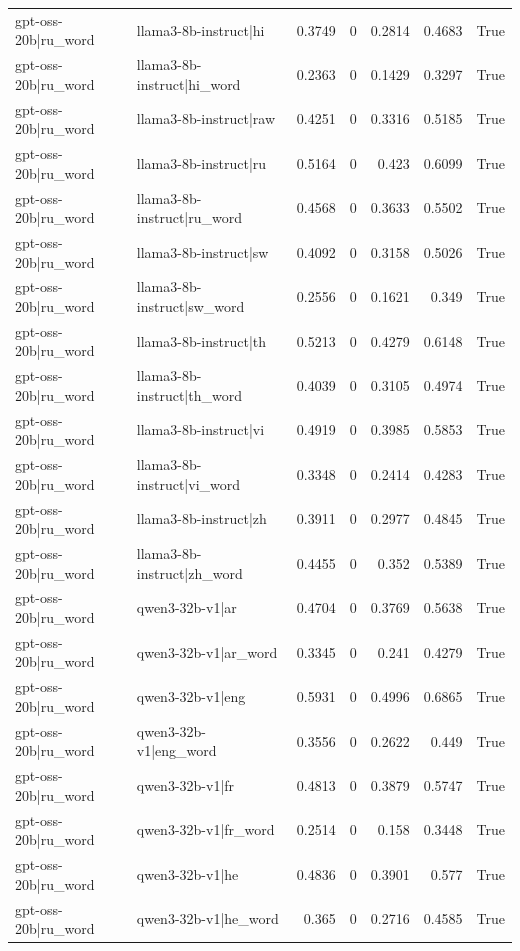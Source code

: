 \begin{table}
\begin{tabular}{l l r r r r l}
gpt-oss-20b|ru_word & llama3-8b-instruct|hi & 0.3749 & 0 & 0.2814 & 0.4683 & True \\
gpt-oss-20b|ru_word & llama3-8b-instruct|hi_word & 0.2363 & 0 & 0.1429 & 0.3297 & True \\
gpt-oss-20b|ru_word & llama3-8b-instruct|raw & 0.4251 & 0 & 0.3316 & 0.5185 & True \\
gpt-oss-20b|ru_word & llama3-8b-instruct|ru & 0.5164 & 0 & 0.423 & 0.6099 & True \\
gpt-oss-20b|ru_word & llama3-8b-instruct|ru_word & 0.4568 & 0 & 0.3633 & 0.5502 & True \\
gpt-oss-20b|ru_word & llama3-8b-instruct|sw & 0.4092 & 0 & 0.3158 & 0.5026 & True \\
gpt-oss-20b|ru_word & llama3-8b-instruct|sw_word & 0.2556 & 0 & 0.1621 & 0.349 & True \\
gpt-oss-20b|ru_word & llama3-8b-instruct|th & 0.5213 & 0 & 0.4279 & 0.6148 & True \\
gpt-oss-20b|ru_word & llama3-8b-instruct|th_word & 0.4039 & 0 & 0.3105 & 0.4974 & True \\
gpt-oss-20b|ru_word & llama3-8b-instruct|vi & 0.4919 & 0 & 0.3985 & 0.5853 & True \\
gpt-oss-20b|ru_word & llama3-8b-instruct|vi_word & 0.3348 & 0 & 0.2414 & 0.4283 & True \\
gpt-oss-20b|ru_word & llama3-8b-instruct|zh & 0.3911 & 0 & 0.2977 & 0.4845 & True \\
gpt-oss-20b|ru_word & llama3-8b-instruct|zh_word & 0.4455 & 0 & 0.352 & 0.5389 & True \\
gpt-oss-20b|ru_word & qwen3-32b-v1|ar & 0.4704 & 0 & 0.3769 & 0.5638 & True \\
gpt-oss-20b|ru_word & qwen3-32b-v1|ar_word & 0.3345 & 0 & 0.241 & 0.4279 & True \\
gpt-oss-20b|ru_word & qwen3-32b-v1|eng & 0.5931 & 0 & 0.4996 & 0.6865 & True \\
gpt-oss-20b|ru_word & qwen3-32b-v1|eng_word & 0.3556 & 0 & 0.2622 & 0.449 & True \\
gpt-oss-20b|ru_word & qwen3-32b-v1|fr & 0.4813 & 0 & 0.3879 & 0.5747 & True \\
gpt-oss-20b|ru_word & qwen3-32b-v1|fr_word & 0.2514 & 0 & 0.158 & 0.3448 & True \\
gpt-oss-20b|ru_word & qwen3-32b-v1|he & 0.4836 & 0 & 0.3901 & 0.577 & True \\
gpt-oss-20b|ru_word & qwen3-32b-v1|he_word & 0.365 & 0 & 0.2716 & 0.4585 & True \\

\end{tabular}
\end{table}
